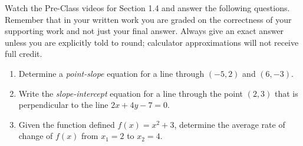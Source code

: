 


\noindent Watch the Pre-Class videos for Section 1.4 and answer the following questions. Remember that in your written work you are graded on the correctness of your supporting work and not just your final answer. Always give an exact answer unless you are explicitly told to round; calculator approximations will not receive full credit. 


\begin{enumerate}
\item  Determine a \emph{point-slope} equation for a line through $(-5,2)$ and $(6,-3)$.

\vfill
\item Write the \emph{slope-intercept} equation for a line through the point $(2,3)$ that is perpendicular to the line $2x+4y-7=0$.

\vfill


\item Given the function defined $f(x)=x^2+3$, determine the average rate of change of $f(x)$ from $x_1=2$ to $x_2=4$.
\vfill

\end{enumerate}



